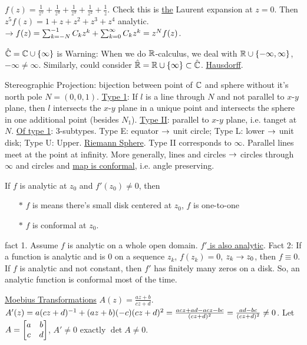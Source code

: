 \documentclass[]{article}
\begin{document}
\begin{example}
	$f(z) = \frac{1}{z^5} + \frac{1}{z^4} + \frac{1}{z^3} + \frac{1}{z^2} + \frac{1}{z}$. Check this is \ul{the} Laurent expansion at $z=0$. Then $z^5f(z) = 1 + z + z^2 + z^3 + z^4$ analytic. $\rightarrow f(z) = \sum_{k=-N}^{-1} C_k z^k + \sum_{k=0}^\infty C_k z^k = z^N f(z)$.
\end{example}

\begin{definition}
	$\hat{\mathbb{C}} = \mathbb{C} \cup \{\infty\}$ is  Warning: When we do $\mathbb{R}$-calculus, we deal with $\mathbb{R}\cup \{-\infty,\infty\}$, $-\infty \neq \infty$. Similarly, could consider $\hat{\mathbb{R}} = \mathbb{R} \cup \{\infty\} \subset \hat{\mathbb{C}}$. \ul{Hausdorff}.
\end{definition}
Stereographic Projection: bijection between point of $\mathbb{C}$ and sphere without it's north pole $N = (0,0,1)$. \ul{Type 1}: If $l$ is a line through $N$ and not parallel to $x$-$y$ plane, then $l$ intersects the $x$-$y$ plane in a unique point and intersects the sphere in one additional point (besides $N_1$). \ul{Type II}: parallel to $x$-$y$ plane, i.e. tanget at $N$. \ul{Of type 1}: 3-subtypes. Type E: equator $\rightarrow$ unit circle; Type L: lower $\rightarrow$ unit disk; Type U: Upper. \ul{Riemann Sphere}. Type II corresponds to $\infty$. Parallel lines meet at the point at infinity. More generally, lines and circles $\rightarrow$ circles through $\infty$ and circles and \ul{map is conformal}, i.e. angle preserving.

\begin{theorem}
	If $f$ is analytic at $z_0$ and $f'(z_0) \neq 0$, then 
	\begin{enumerate}
		\item[$*$] $f$ is  means there's small disk centered at $z_0$, $f$ is one-to-one
		\item[$*$] $f$ is conformal at $z_0$.
	\end{enumerate}
\end{theorem}
fact 1. Assume $f$ is analytic on a whole open domain. \ul{$f'$ is also analytic}.
Fact 2: If a function is analytic and is 0 on a sequence $z_k$, $f(z_k) = 0$, $z_k\rightarrow z_0$, then $f\equiv 0$.
If $f$ is analytic and not constant, then $f'$ has finitely many zeros on a disk. So, an analytic function is conformal most of the time.

\ul{Moebius Transformations} $A(z) = \frac{az+b}{cz+d}$. $A'(z) = a(cz+d)^{-1} + (az+b)(-c)(cz+d)^2 = \frac{acz+ad-acz-bc}{(cz+d)^2} = \frac{ad-bc}{(cz+d)^2} \neq 0$. Let $A = \begin{bmatrix}a & b \\ c & d\end{bmatrix}$, $A'\neq 0$ exactly $\det{A} \neq 0$.
\end{document}
